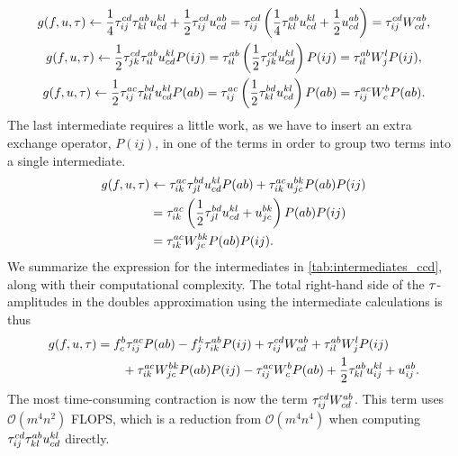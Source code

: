         \begin{gather}
            g(f, u, \tau)
            \gets
            \frac{1}{4} \tau^{cd}_{ij} \tau^{ab}_{kl} u^{kl}_{cd}
            + \frac{1}{2} \tau^{cd}_{ij} u^{ab}_{cd}
            =
            \tau^{cd}_{ij}\left( 
                \frac{1}{4} \tau^{ab}_{kl} u^{kl}_{cd}
                + \frac{1}{2} u^{ab}_{cd}
             \right)
            = \tau^{cd}_{ij}W^{ab}_{cd},
            \\
            g(f, u, \tau)
            \gets
            \frac{1}{2} \tau^{cd}_{jk} \tau^{ab}_{il} u^{kl}_{cd} P(ij)
            = \tau^{ab}_{il}\left( 
                \frac{1}{2} \tau^{cd}_{jk} u^{kl}_{cd}
             \right) P(ij)
            = \tau^{ab}_{il} W^{l}_{j} P(ij),
            \\
            g(f, u, \tau)
            \gets
            \frac{1}{2} \tau^{ac}_{ij} \tau^{bd}_{kl} u^{kl}_{cd} P(ab)
            = \tau^{ac}_{ij}\left( 
                \frac{1}{2} \tau^{bd}_{kl} u^{kl}_{cd}
             \right) P(ab)
            = \tau^{ac}_{ij} W^{b}_{c} P(ab).
        \end{gather}
        The last intermediate requires a little work, as we have to insert an
        extra exchange operator, $P(ij)$, in one of the terms in order to group
        two terms into a single intermediate.
        \begin{align}
            g(f, u, \tau)
            &\gets
            \tau^{ac}_{ik} \tau^{bd}_{jl} u^{kl}_{cd} P(ab)
            + \tau^{ac}_{ik} u^{bk}_{jc} P(ab) P(ij)
            \\
            &= \tau^{ac}_{ik}\left( 
                \frac{1}{2} \tau^{bd}_{jl} u^{kl}_{cd}
                + u^{bk}_{jc}
             \right) P(ab) P(ij)
            \\
            &= \tau^{ac}_{ik} W^{bk}_{jc} P(ab) P(ij).
        \end{align}
        We summarize the expression for the intermediates in
        \autoref{tab:intermediates_ccd}, along with their computational
        complexity. The total right-hand side of the $\tau$-amplitudes in the
        doubles approximation using the intermediate calculations is thus
        \begin{align}
            g(f, u, \tau)
            &=
            f^{b}_{c} \tau^{ac}_{ij} P(ab)
            - f^{k}_{j} \tau^{ab}_{ik} P(ij)
            + \tau^{cd}_{ij} W^{ab}_{cd}
            + \tau^{ab}_{il} W^{l}_{j} P(ij)
            \nonumber \\
            &\qquad
            + \tau^{ac}_{ik} W^{bk}_{jc} P(ab) P(ij)
            - \tau^{ac}_{ij} W^{b}_{c} P(ab)
            + \frac{1}{2} \tau^{ab}_{kl} u^{kl}_{ij}
            + u^{ab}_{ij}.
        \end{align}
        The most time-consuming contraction is now the term $\tau^{cd}_{ij}
        W^{ab}_{cd}$. This term uses $\mathcal{O}(m^4 n^2)$ FLOPS, which is a
        reduction from $\mathcal{O}(m^4 n^4)$ when computing $\tau^{cd}_{ij}
        \tau^{ab}_{kl} u^{kl}_{cd}$ directly.

